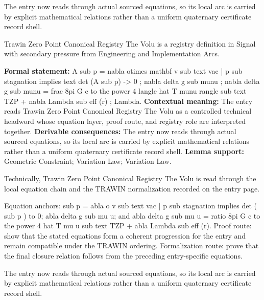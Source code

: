 The entry now reads through actual sourced equations, so its local arc is carried by explicit mathematical relations rather than a uniform quaternary certificate record shell.
\clearpage


\begingroup\small
{}
Trawin Zero Point Canonical Registry The Volu is a registry definition in Signal with secondary pressure from Engineering and Implementation Arcs.

\begingroup\footnotesize\setlength{\emergencystretch}{3em}\sloppy
\textbf{Formal statement:} A sub p = nabla otimes mathbf v sub text vac | p sub stagnation implies text det (A sub p) -> 0 ; nabla delta g sub munu ; nabla delta g sub munu = frac 8pi G c to the power 4 langle hat T munu rangle sub text TZP + nabla Lambda sub eff (r) ; Lambda. \textbf{Contextual meaning:} The entry reads Trawin Zero Point Canonical Registry The Volu as a controlled technical headword whose equation layer, proof route, and registry role are interpreted together. \textbf{Derivable consequences:} The entry now reads through actual sourced equations, so its local arc is carried by explicit mathematical relations rather than a uniform quaternary certificate record shell. \textbf{Lemma support:} Geometric Constraint; Variation Law; Variation Law.\par
\endgroup

Technically, Trawin Zero Point Canonical Registry The Volu is read through the local equation chain and the TRAWIN normalization recorded on the entry page.

Equation anchors:     sub p = abla o v sub text vac | p sub stagnation implies det (    sub p ) to 0; abla delta g sub mu u; and abla delta g sub mu u = ratio 8pi G c to the power 4 hat T mu u sub text TZP + abla Lambda sub eff (r). Proof route: show that the stated equations form a coherent progression for the entry and remain compatible under the TRAWIN ordering. Formalization route: prove that the final closure relation follows from the preceding entry-specific equations.

The entry now reads through actual sourced equations, so its local arc is carried by explicit mathematical relations rather than a uniform quaternary certificate record shell.
\endgroup

